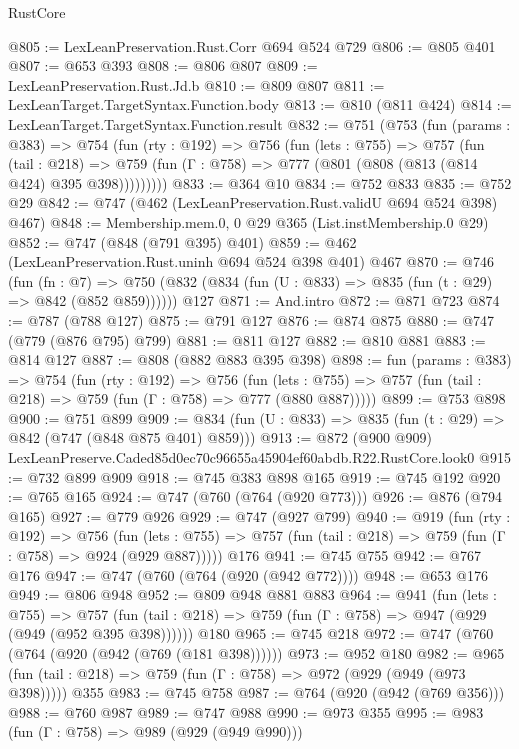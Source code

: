 \begin{lexlean}{RustCore}
\begin{coremodule}
@805 := LexLeanPreservation.Rust.Corr @694 @524 @729
@806 := @805 @401
@807 := @653 @393
@808 := @806 @807
@809 := LexLeanPreservation.Rust.Jd.b
@810 := @809 @807
@811 := LexLeanTarget.TargetSyntax.Function.body
@813 := @810 (@811 @424)
@814 := LexLeanTarget.TargetSyntax.Function.result
@832 := @751
    (@753
      (fun (params : @383) =>
      @754
        (fun (rty : @192) =>
        @756
          (fun (lets : @755) =>
          @757
            (fun (tail : @218) =>
            @759 (fun (Γ : @758) => @777 (@801 (@808 (@813 (@814 @424) @395 @398)))))))))
@833 := @364 @10
@834 := @752 @833
@835 := @752 @29
@842 := @747 (@462 (LexLeanPreservation.Rust.validU @694 @524 @398) @467)
@848 := Membership.mem.{0, 0} @29 @365 (List.instMembership.{0} @29)
@852 := @747 (@848 (@791 @395) @401)
@859 := @462 (LexLeanPreservation.Rust.uninh @694 @524 @398 @401) @467
@870 := @746
    (fun (fn : @7) =>
    @750 (@832 (@834 (fun (U : @833) => @835 (fun (t : @29) => @842 (@852 @859))))))
    @127
@871 := And.intro
@872 := @871 @723
@874 := @787 (@788 @127)
@875 := @791 @127
@876 := @874 @875
@880 := @747 (@779 (@876 @795) @799)
@881 := @811 @127
@882 := @810 @881
@883 := @814 @127
@887 := @808 (@882 @883 @395 @398)
@898 := fun (params : @383) =>
  @754
    (fun (rty : @192) =>
    @756
      (fun (lets : @755) => @757 (fun (tail : @218) => @759 (fun (Γ : @758) => @777 (@880 @887)))))
@899 := @753 @898
@900 := @751 @899
@909 := @834 (fun (U : @833) => @835 (fun (t : @29) => @842 (@747 (@848 @875 @401) @859)))
@913 := @872 (@900 @909) LexLeanPreserve.Caded85d0ec70c96655a45904ef60abdb.R22.RustCore.look0
@915 := @732 @899 @909
@918 := @745 @383 @898 @165
@919 := @745 @192
@920 := @765 @165
@924 := @747 (@760 (@764 (@920 @773)))
@926 := @876 (@794 @165)
@927 := @779 @926
@929 := @747 (@927 @799)
@940 := @919
    (fun (rty : @192) =>
    @756
      (fun (lets : @755) => @757 (fun (tail : @218) => @759 (fun (Γ : @758) => @924 (@929 @887)))))
    @176
@941 := @745 @755
@942 := @767 @176
@947 := @747 (@760 (@764 (@920 (@942 @772))))
@948 := @653 @176
@949 := @806 @948
@952 := @809 @948 @881 @883
@964 := @941
    (fun (lets : @755) =>
    @757 (fun (tail : @218) => @759 (fun (Γ : @758) => @947 (@929 (@949 (@952 @395 @398))))))
    @180
@965 := @745 @218
@972 := @747 (@760 (@764 (@920 (@942 (@769 (@181 @398))))))
@973 := @952 @180
@982 := @965 (fun (tail : @218) => @759 (fun (Γ : @758) => @972 (@929 (@949 (@973 @398))))) @355
@983 := @745 @758
@987 := @764 (@920 (@942 (@769 @356)))
@988 := @760 @987
@989 := @747 @988
@990 := @973 @355
@995 := @983 (fun (Γ : @758) => @989 (@929 (@949 @990)))

\end{coremodule}
\end{lexlean}
